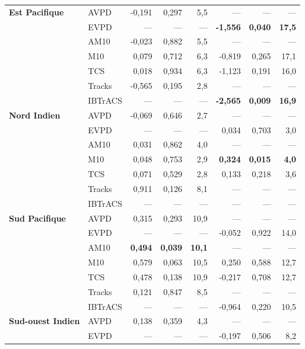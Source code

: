 \documentclass[../main.tex]{subfiles}
\begin{document}
\begin{table}[htpb]
\begin{adjustbox}{height=0.45\textheight}
\begin{tabular}{llrrr|rrr}
        \cline{1-8}
        \multirow[t]{7}{*}{\textbf{Est Pacifique}} & AVPD & -0,191 & 0,297 & 5,5 & --- & --- & --- \\
         & EVPD & --- & --- & --- & \textbf{-1,556} & \textbf{0,040} & \textbf{17,5} \\
         & AM10 & -0,023 & 0,882 & 5,5 & --- & --- & --- \\
         & M10 & 0,079 & 0,712 & 6,3 & -0,819 & 0,265 & 17,1 \\
         & TCS & 0,018 & 0,934 & 6,3 & -1,123 & 0,191 & 16,0 \\
         & Tracks & -0,565 & 0,195 & 2,8 & --- & --- & --- \\
         & IBTrACS & --- & --- & --- & \textbf{-2,565} & \textbf{0,009} & \textbf{16,9} \\
        \cline{1-8}
        \multirow[t]{7}{*}{\textbf{Nord Indien}} & AVPD & -0,069 & 0,646 & 2,7 & --- & --- & --- \\
         & EVPD & --- & --- & --- & 0,034 & 0,703 & 3,0 \\
         & AM10 & 0,031 & 0,862 & 4,0 & --- & --- & --- \\
         & M10 & 0,048 & 0,753 & 2,9 & \textbf{0,324} & \textbf{0,015} & \textbf{4,0} \\
         & TCS & 0,071 & 0,529 & 2,8 & 0,133 & 0,218 & 3,6 \\
         & Tracks & 0,911 & 0,126 & 8,1 & --- & --- & --- \\
         & IBTrACS & --- & --- & --- & --- & --- & --- \\
        \cline{1-8}
        \multirow[t]{7}{*}{\textbf{Sud Pacifique}} & AVPD & 0,315 & 0,293 & 10,9 & --- & --- & --- \\
         & EVPD & --- & --- & --- & -0,052 & 0,922 & 14,0 \\
         & AM10 & \textbf{0,494} & \textbf{0,039} & \textbf{10,1} & --- & --- & --- \\
         & M10 & 0,579 & 0,063 & 10,5 & 0,250 & 0,588 & 12,7 \\
         & TCS & 0,478 & 0,138 & 10,9 & -0,217 & 0,708 & 12,7 \\
         & Tracks & 0,121 & 0,847 & 8,5 & --- & --- & --- \\
         & IBTrACS & --- & --- & --- & -0,964 & 0,220 & 10,5 \\
        \cline{1-8}
        \multirow[t]{7}{*}{\textbf{Sud-ouest Indien}} & AVPD & 0,138 & 0,359 & 4,3 & --- & --- & --- \\
         & EVPD & --- & --- & --- & -0,197 & 0,506 & 8,2 \\

\end{tabular}
\end{adjustbox}
\end{table}
\end{document}
